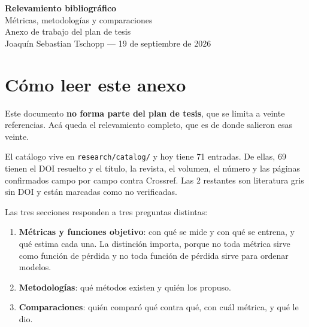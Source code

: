 \documentclass{../comun/tesisuba}
\begin{document}
\begin{center}
  {\large \textbf{Relevamiento bibliográfico}}\\[0.2cm]
  {\normalsize Métricas, metodologías y comparaciones}\\[0.3cm]
  {\small Anexo de trabajo del plan de tesis\\
  Joaquín Sebastian Tschopp --- 19 de septiembre de 2026}
\end{center}

\vspace{0.8cm}

\section*{Cómo leer este anexo}

Este documento \textbf{no forma parte del plan de tesis}, que se limita a veinte referencias.
Acá queda el relevamiento completo, que es de donde salieron esas veinte.

El catálogo vive en \texttt{research/catalog/} y hoy tiene 71 entradas.
De ellas, 69 tienen el DOI resuelto y el título, la revista, el volumen, el número y las páginas
confirmados campo por campo contra Crossref.
Las 2 restantes son literatura gris sin DOI y están marcadas como no verificadas.

\medskip
\noindent{}

\medskip

Las tres secciones responden a tres preguntas distintas:

\begin{enumerate}[nosep]
  \item \textbf{Métricas y funciones objetivo}: con qué se mide y con qué se entrena, y qué estima
        cada una. La distinción importa, porque no toda métrica sirve como función de pérdida y no
        toda función de pérdida sirve para ordenar modelos.
  \item \textbf{Metodologías}: qué métodos existen y quién los propuso.
  \item \textbf{Comparaciones}: quién comparó qué contra qué, con cuál métrica, y qué le dio.
\end{enumerate}
\end{document}
